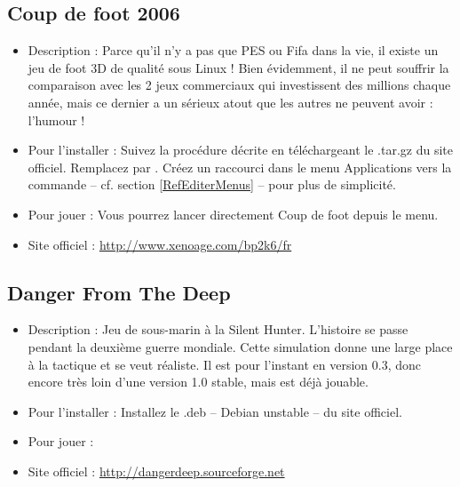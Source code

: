 \subsection{Coup de foot 2006}
\begin{itemize}
\begingroup
{}
\item Description : Parce qu'il n'y a pas que PES ou Fifa dans la vie, il existe un jeu  de foot 3D de qualité sous Linux ! Bien évidemment, il ne peut souffrir la comparaison avec les 2 jeux commerciaux qui investissent des millions chaque année, mais ce dernier a un sérieux atout que les autres ne peuvent avoir : l'humour !{\par}
\endgroup
\item Pour l'installer : Suivez la procédure décrite en téléchargeant le .tar.gz du site officiel. Remplacez  par . Créez un raccourci dans le menu Applications vers la commande  -- cf. section \ref{RefEditerMenus} -- pour plus de simplicité.{\par}
\item Pour jouer : Vous pourrez lancer directement Coup de foot depuis le menu.{\par}
\item Site officiel : \url{http://www.xenoage.com/bp2k6/fr}{\par}
\end{itemize}
\subsection{Danger From The Deep}
\begin{itemize}
\begingroup
{}
\item Description : Jeu de sous-marin à la Silent Hunter. L'histoire se passe pendant la deuxième guerre mondiale. Cette simulation donne une large place à la tactique et se veut réaliste. Il est pour l'instant en version 0.3, donc encore très loin d'une version 1.0 stable, mais est déjà jouable.{\par}
\endgroup
\item Pour l'installer : Installez le .deb -- Debian unstable -- du site officiel.{\par}
\item Pour jouer : 
\item Site officiel : \url{http://dangerdeep.sourceforge.net}{\par}
\end{itemize}
